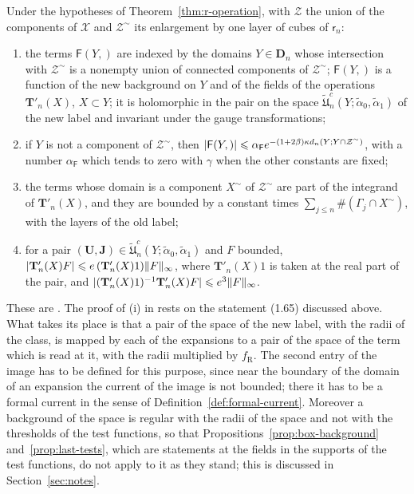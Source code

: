 \documentclass[11pt]{preprint}
\makeatletter
\DeclarePairedDelimiter{\abs}{\lvert}{\rvert}
\DeclarePairedDelimiter{\norm}{\lVert}{\rVert}
\newcommand*{\bigcdot}{}%
\DeclareRobustCommand*{\bigcdot}{%
	\mathbin{\mathpalette\bigcdot@{}}%
}
\newcommand*{\bigcdot@scalefactor}{.7}
\newcommand*{\bigcdot@widthfactor}{1.15}
\newcommand*{\bigcdot@}[2]{%
	\sbox0{$#1\vcenter{}$}%
	\sbox2{$#1\cdot\m@th$}%
	\hbox to \bigcdot@widthfactor\wd2{%
		\hss
		\raise\ht0\hbox{%
			\scalebox{\bigcdot@scalefactor}{%
				\lower\ht0\hbox{$#1\bullet\m@th$}%
			}%
		}%
		\hss
	}%
}
\numberwithin{equation}{section}
\makeatother
\begin{document}
\begin{proposition}\label{prop:r-local-terms}
Under the hypotheses of Theorem~\ref{thm:r-operation}, with $\mathcal Z$ the union of the components of $\mathcal X$ and $\mathcal Z^\sim$ its enlargement by one layer of cubes of $\mathsf r_n$:
\begin{enumerate}[label=(\roman*)]
\item the terms $\mathsf F(Y,\bigcdot)$ are indexed by the domains $Y \in \mathbf D_n$ whose intersection with $\mathcal Z^\sim$ is a nonempty union of connected components of $\mathcal Z^\sim$; $\mathsf F(Y,\bigcdot)$ is a function of the new background on $Y$ and of the fields of the operations $\mathbf T'_n(X)$, $X \subset Y$; it is holomorphic in the pair on the space $\tilde{\mathfrak U}^c_n(Y; \tilde\alpha_0, \tilde\alpha_1)$ of the new label and invariant under the gauge transformations;
\item if $Y$ is not a component of $\mathcal Z^\sim$, then $\abs{\mathsf F(Y,\bigcdot)} \leqslant \alpha_{\mathsf F}e^{-(1+2\beta)\kappa d_n(Y; Y \cap \mathcal Z^\sim)}$, with a number $\alpha_{\mathsf F}$ which tends to zero with $\gamma$ when the other constants are fixed;
\item the terms whose domain is a component $X^\sim$ of $\mathcal Z^\sim$ are part of the integrand of $\mathbf T'_n(X)$, and they are bounded by a constant times $\sum_{j \leqslant n}\#(\Gamma_j \cap X^\sim)$, with the layers of the old label;
\item for a pair $(\mathbf U, \mathbf J) \in \tilde{\mathfrak U}^c_n(Y; \tilde\alpha_0, \tilde\alpha_1)$ and $F$ bounded, $\abs{\mathbf T'_n(X)F} \leqslant e\,(\mathbf T'_n(X)1)\norm F_\infty$, where $\mathbf T'_n(X)1$ is taken at the real part of the pair, and $\abs{(\mathbf T'_n(X)1)^{-1}\mathbf T'_n(X)F} \leqslant e^3\norm F_\infty$.
\end{enumerate}
\end{proposition}

These are \cite[(1.68), (1.69), (1.73)--(1.75), pp.~377--380]{BalabanLFR2}. The proof of (i) in \cite{BalabanLFR2} rests on the statement (1.65) discussed above. What takes its place is that a pair of the space of the new label, with the radii of the class, is mapped by each of the expansions to a pair of the space of the term which is read at it, with the radii multiplied by $f_{\mathrm R}$. The second entry of the image has to be defined for this purpose, since near the boundary of the domain of an expansion the current of the image is not bounded; there it has to be a formal current in the sense of Definition~\ref{def:formal-current}. Moreover a background of the space is regular with the radii of the space and not with the thresholds of the test functions, so that Propositions~\ref{prop:box-background} and~\ref{prop:last-tests}, which are statements at the fields in the supports of the test functions, do not apply to it as they stand; this is discussed in Section~\ref{sec:notes}.
\end{document}
